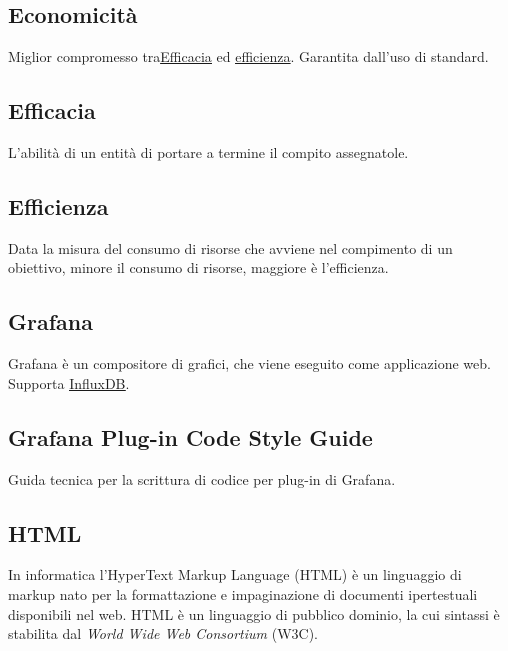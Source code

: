 	\newpage


	\subsection{Economicità}
	\label{sec:economicita}
	Miglior compromesso tra\underline{\hyperref[sec:efficacia]{Efficacia}} ed \underline{\hyperref[sec:efficienza]{efficienza}}. Garantita dall'uso di standard.

	\subsection{Efficacia}
	\label{sec:efficacia}
	L'abilità di un entità di portare a termine il compito assegnatole.


	\subsection{Efficienza}
	\label{sec:efficienza}
	Data la misura del consumo di risorse che avviene nel compimento di un obiettivo, minore il consumo di risorse, maggiore è l'efficienza.
	
	
	\newpage
	
	\subsection{Grafana}
	\label{sec:grafana}
	Grafana è un compositore di grafici, che viene eseguito come applicazione web. Supporta \underline{\hyperref[sec:influxdb]{InfluxDB}}.


	\subsection{Grafana Plug-in Code Style Guide}
	\label{sec:grafana}
	Guida tecnica per la scrittura di codice per plug-in di Grafana.	
	

	\newpage 


	\subsection{HTML}
	\label{sec:html}
	In informatica l'HyperText Markup Language (HTML) è un linguaggio di markup  nato per la formattazione e impaginazione di documenti ipertestuali disponibili nel web. HTML è un linguaggio di pubblico dominio, la cui sintassi è stabilita dal \emph{World Wide Web Consortium} (W3C).
	

